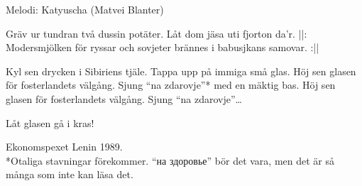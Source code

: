 \begin{song}

\begin{songmeta}
Melodi: Katyuscha (Matvei Blanter)
\end{songmeta}

\begin{songtext}
Gräv ur tundran två dussin potäter.
Låt dom jäsa uti fjorton da'r.
||: Modersmjölken för ryssar och sovjeter
brännes i babusjkans samovar. :||

Kyl sen drycken i Sibiriens tjäle.
Tappa upp på immiga små glas.
Höj sen glasen för fosterlandets välgång.
Sjung \textquotedblleft{}na zdarovje\textquotedblright{}* med en mäktig bas.
Höj sen glasen för fosterlandets välgång.
Sjung \textquotedblleft{}na zdarovje\textquotedblright{}\ldots

Låt glasen gå i kras!
\end{songtext}
\begin{songnotes}
Ekonomspexet Lenin 1989.\\
*Otaliga stavningar förekommer. \textquotedblleft{}\textrussian{на здоровье}\textquotedblright{} bör det vara, men det är så många som inte kan läsa det.
\end{songnotes}

\end{song}
